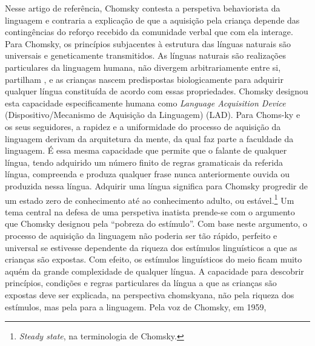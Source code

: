 \documentclass[output=paper]{LSP/langsci}
\begin{document}
Nesse artigo de referência, Chomsky contesta a perspetiva behaviorista da linguagem e contraria a explicação de que a aquisição pela criança depende das contingências do reforço recebido da comunidade verbal que com ela interage. Para Chomsky, os princípios subjacentes à estrutura das línguas naturais são universais e geneticamente transmitidos. As línguas naturais são realizações particulares da linguagem humana, não divergem arbitrariamente entre si, partilham , e as crianças nascem predispostas biologicamente para adquirir qualquer língua constituída de acordo com essas propriedades. Chomsky designou esta capacidade especificamente humana como \emph{Language Acquisition Device}  (Dispositivo/Mecanismo de Aquisição da Linguagem) (LAD). Para Choms-\linebreak ky e os seus seguidores, a rapidez e a uniformidade do processo de aquisição da linguagem derivam da arquitetura da mente, da qual faz parte a faculdade da linguagem. É essa mesma capacidade que permite que o falante de qualquer língua, tendo adquirido um número finito de regras gramaticais da referida língua, compreenda e produza qualquer frase nunca anteriormente ouvida ou produzida nessa língua. Adquirir uma língua significa para Chomsky progredir de um estado zero de conhecimento até ao conhecimento adulto, ou estável.\footnote{\textit{Steady state}, na terminologia de Chomsky.} Um tema central na defesa de uma perspetiva inatista prende-se com o argumento que Chomsky designou pela ``pobreza do estímulo''. Com base neste argumento, o processo de aquisição da linguagem não poderia ser tão rápido, perfeito e universal se estivesse dependente da riqueza dos estímulos linguísticos a que as crianças são expostas. Com efeito, os estímulos linguísticos do meio ficam muito aquém da grande complexidade de qualquer língua. A capacidade para descobrir princípios, condições e regras particulares da língua a que as crianças são expostas deve ser explicada, na perspectiva chomskyana, não pela riqueza dos estímulos, mas pela  para a linguagem.  Pela voz de Chomsky, em 1959,
\end{document}
